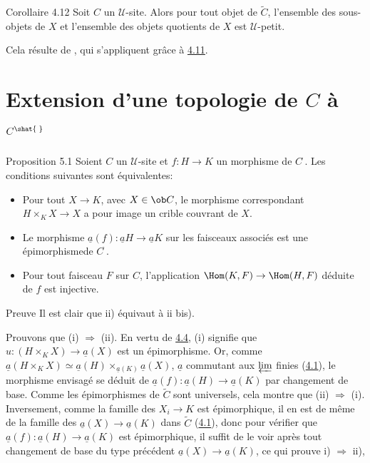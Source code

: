 \begin{enonce*}{Corollaire 4.12}
Soit $C$ un $𝒰$-site. Alors pour tout objet de
$\widetilde{C}$, l'ensemble des sous-objets de $X$ et l'ensemble des
objets quotients de $X$ est $𝒰$-petit.
\end{enonce*}

Cela résulte de  \resp {}, qui
s'appliquent grâce à \hyperref[II.cor4.11]{4.11}.

\section{Extension d'une topologie de $C$ à
  $C^{\shat{\;\hbox{}}}$}

\begin{enonce*}{Proposition 5.1}
Soient $C$ un $𝒰$-site et $f:H\rightarrow K$ un morphisme de
$C^{\widehat{\phantom{,}}}$. Les conditions suivantes sont
équivalentes:
\begin{itemize}
\item[i)] Pour tout $X\rightarrow K$, avec $X\in \ob C$, le morphisme
  correspondant $H\times_K X\rightarrow X$ a pour image un crible
  couvrant de $X$.

\item[ii)] Le morphisme $\underline{a}(f):\underline{a}H\rightarrow \underline{a}K$ sur
  les faisceaux associés est une épimorphisme\pageoriginale de
  $C^{\widetilde{\phantom{,}}}$.

\item[ii bis)] Pour tout faisceau $F$ sur $C$, l'application
  $\Hom(K,F)\rightarrow \Hom(H,F)$ déduite de $f$ est injective.
\end{itemize}
\end{enonce*}

\begin{enonce*}[remark]{Preuve}
Il est clair que ii) équivaut à ii bis).
\end{enonce*}

Prouvons que (i) $\Rightarrow$ (ii). En vertu de \hyperref[II.theo4.4]{4.4},
(i) signifie que $u:(H\times_K X)\rightarrow \underline{a}(X)$ est un
épimorphisme. Or, comme $\underline{a}(H\times_K X)\simeq
\underline{a}(H)\times_{\underline{a}(K)}\underline{a}(X)$, $\underline{a}$
commutant aux $\varprojlim$ finies (\hyperref[II.theo4.1]{4.1}), le morphisme
envisagé se déduit de $\underline{a}(f):\underline{a}(H)\rightarrow
\underline{a}(K)$ par changement de base. Comme les épimorphismes de
$\widetilde{C}$ sont universels, cela montre que (ii) $\Rightarrow$
(i). Inversement, comme la famille des $X_i\rightarrow K$ est
épimorphique, il en est de même de la famille des
$\underline{a}(X)\rightarrow \underline{a}(K)$ dans $\widetilde{C}$
(\hyperref[II.theo4.1]{4.1}), donc pour vérifier que
$\underline{a}(f):\underline{a}(H)\rightarrow \underline{a}(K)$ est
épimorphique, il suffit de le voir après tout changement de base
du type précédent $\underline{a}(X)\rightarrow \underline{a}(K)$, ce qui
prouve i) $\Rightarrow$ ii), \cqfd

